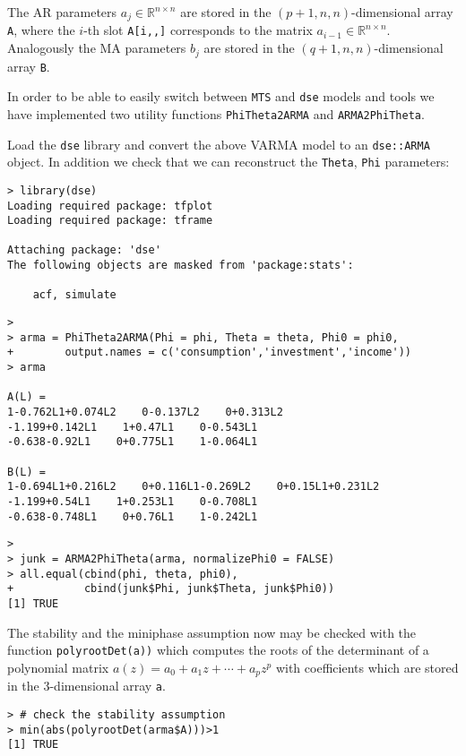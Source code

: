 \documentclass[]{article}
\begin{document}
The AR parameters \(a_j\in \mathbb{R}^{n\times n}\) are stored in the
\((p+1,n,n)\)-dimensional array \texttt{A}, where the \(i\)-th slot
\texttt{A{[}i,,{]}} corresponds to the matrix
\(a_{i-1}\in \mathbb{R}^{n\times n}\). Analogously the MA parameters
\(b_j\) are stored in the \((q+1,n,n)\)-dimensional array \texttt{B}.

In order to be able to easily switch between \texttt{MTS} and
\texttt{dse} models and tools we have implemented two utility functions
\texttt{PhiTheta2ARMA} and \texttt{ARMA2PhiTheta}.

Load the \texttt{dse} library and convert the above VARMA model to an
\texttt{dse::ARMA} object. In addition we check that we can reconstruct
the \texttt{Theta}, \texttt{Phi} parameters:

\begin{verbatim}
> library(dse)
Loading required package: tfplot
Loading required package: tframe

Attaching package: 'dse'
The following objects are masked from 'package:stats':

    acf, simulate
\end{verbatim}

\begin{verbatim}
> 
> arma = PhiTheta2ARMA(Phi = phi, Theta = theta, Phi0 = phi0, 
+        output.names = c('consumption','investment','income'))
> arma

A(L) =
1-0.762L1+0.074L2    0-0.137L2    0+0.313L2    
-1.199+0.142L1    1+0.47L1    0-0.543L1    
-0.638-0.92L1    0+0.775L1    1-0.064L1    

B(L) =
1-0.694L1+0.216L2    0+0.116L1-0.269L2    0+0.15L1+0.231L2    
-1.199+0.54L1    1+0.253L1    0-0.708L1    
-0.638-0.748L1    0+0.76L1    1-0.242L1    
\end{verbatim}

\begin{verbatim}
> 
> junk = ARMA2PhiTheta(arma, normalizePhi0 = FALSE)
> all.equal(cbind(phi, theta, phi0),
+           cbind(junk$Phi, junk$Theta, junk$Phi0))
[1] TRUE
\end{verbatim}

The stability and the miniphase assumption now may be checked with the
function \texttt{polyrootDet(a))} which computes the roots of the
determinant of a polynomial matrix
\(a(z) = a_0 + a_1 z +\cdots + a_p z^p\) with coefficients which are
stored in the 3-dimensional array \texttt{a}.

\begin{verbatim}
> # check the stability assumption 
> min(abs(polyrootDet(arma$A)))>1
[1] TRUE
\end{verbatim}
\end{document}
